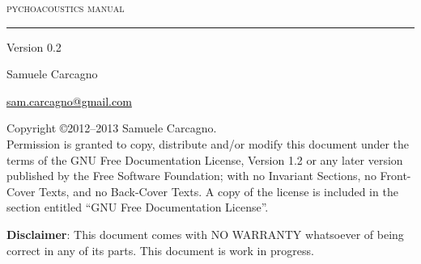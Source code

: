 \begin{center}
\Huge \textsc{pychoacoustics manual} \\
\rule{\textwidth}{1mm}
\end{center}
{\flushright \normalsize Version 0.2}\\
\begin{center}
\vspace{.2cm}

\Large Samuele Carcagno
\normalsize \\
\vspace{.3cm}


\href{mailto:sam.carcagno@gmail.com}{\textcolor{black}{sam.carcagno@gmail.com}}
\end{center}


\clearpage
\noindent Copyright \copyright  2012--2013  Samuele Carcagno.\\
      Permission is granted to copy, distribute and/or modify this document
      under the terms of the GNU Free Documentation License, Version 1.2
      or any later version published by the Free Software Foundation;
      with no Invariant Sections, no Front-Cover Texts, and no Back-Cover
	 Texts.  A copy of the license is included in the section entitled ``GNU      Free Documentation License''.

\vspace{2cm}
\noindent \textbf{Disclaimer}: This document comes with NO WARRANTY whatsoever of being correct in any of its parts.
This document is work in progress.
